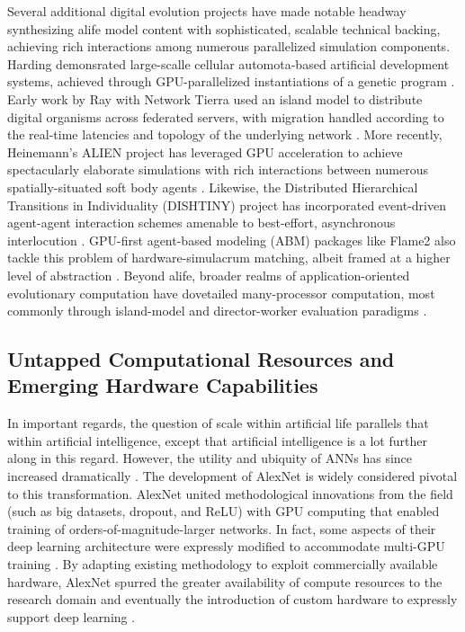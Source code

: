 Several additional digital evolution projects have made notable headway synthesizing alife model content with sophisticated, scalable technical backing, achieving rich interactions among numerous parallelized simulation components.
Harding demonsrated large-scalle cellular automota-based artificial development systems, achieved through GPU-parallelized instantiations of a genetic program  \citep{harding2007fast_ieee}.
Early work by Ray with Network Tierra used an island model to distribute digital organisms across federated servers, with migration  handled according to the real-time latencies and topology of the underlying network \citep{ray1995proposal}.
More recently, Heinemann's ALIEN project has leveraged GPU acceleration to achieve spectacularly elaborate simulations with rich interactions between numerous spatially-situated soft body agents \citep{heinemann2008artificial}.
Likewise, the Distributed Hierarchical Transitions in Individuality (DISHTINY) project has incorporated event-driven agent-agent interaction schemes amenable to best-effort, asynchronous interlocution .
GPU-first agent-based modeling (ABM) packages like Flame2 also tackle this problem of hardware-simulacrum matching, albeit framed at a higher level of abstraction \citep{TODO}.
Beyond alife, broader realms of application-oriented evolutionary computation have dovetailed many-processor computation, most commonly through island-model and director-worker evaluation paradigms \citep{TODO}.

\subsection{Untapped Computational Resources and Emerging Hardware Capabilities}

In important regards, the question of scale within artificial life parallels that within artificial intelligence, except that artificial intelligence is a lot further along in this regard.
However, the utility and ubiquity of ANNs has since increased dramatically \citep{marcus2018deep}.
The development of AlexNet is widely considered pivotal to this transformation.
AlexNet united methodological innovations from the field (such as big datasets, dropout, and ReLU) with GPU computing that enabled training of orders-of-magnitude-larger networks.
In fact, some aspects of their deep learning architecture were expressly modified to accommodate multi-GPU training \citep{krizhevsky2012imagenet}.
By adapting existing methodology to exploit commercially available hardware, AlexNet spurred the greater availability of compute resources to the research domain and eventually the introduction of custom hardware to expressly support deep learning \citep{jouppi2017datacenter}.

